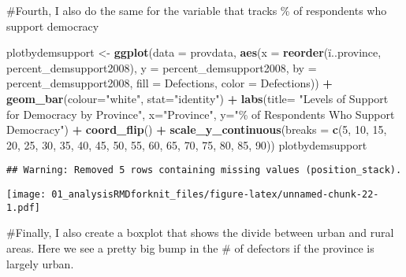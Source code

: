 \documentclass[]{article}
\newenvironment{Shaded}{\begin{snugshade}}{\end{snugshade}}
\newcommand{\DataTypeTok}[1]{\textcolor[rgb]{0.13,0.29,0.53}{#1}}
\newcommand{\DecValTok}[1]{\textcolor[rgb]{0.00,0.00,0.81}{#1}}
\newcommand{\KeywordTok}[1]{\textcolor[rgb]{0.13,0.29,0.53}{\textbf{#1}}}
\newcommand{\NormalTok}[1]{#1}
\newcommand{\OperatorTok}[1]{\textcolor[rgb]{0.81,0.36,0.00}{\textbf{#1}}}
\newcommand{\StringTok}[1]{\textcolor[rgb]{0.31,0.60,0.02}{#1}}
\begin{document}
\#Fourth, I also do the same for the variable that tracks \% of
respondents who support democracy

\begin{Shaded}
\begin{Highlighting}[]
\NormalTok{plotbydemsupport <{-}}\StringTok{ }\KeywordTok{ggplot}\NormalTok{(}\DataTypeTok{data =}\NormalTok{ provdata, }\KeywordTok{aes}\NormalTok{(}\DataTypeTok{x =} \KeywordTok{reorder}\NormalTok{(ï..province, percent\_demsupport2008), }\DataTypeTok{y =}\NormalTok{ percent\_demsupport2008, }\DataTypeTok{by =}\NormalTok{ percent\_demsupport2008, }\DataTypeTok{fill =}\NormalTok{ Defections, }\DataTypeTok{color =}\NormalTok{ Defections)) }\OperatorTok{+}\StringTok{ }\KeywordTok{geom\_bar}\NormalTok{(}\DataTypeTok{colour=}\StringTok{"white"}\NormalTok{, }\DataTypeTok{stat=}\StringTok{"identity"}\NormalTok{) }\OperatorTok{+}\StringTok{ }\KeywordTok{labs}\NormalTok{(}\DataTypeTok{title=} \StringTok{"Levels of Support for Democracy by Province"}\NormalTok{, }\DataTypeTok{x=}\StringTok{"Province"}\NormalTok{, }\DataTypeTok{y=}\StringTok{"\% of Respondents Who Support Democracy"}\NormalTok{) }\OperatorTok{+}\StringTok{ }\KeywordTok{coord\_flip}\NormalTok{() }\OperatorTok{+}\StringTok{ }\KeywordTok{scale\_y\_continuous}\NormalTok{(}\DataTypeTok{breaks =} \KeywordTok{c}\NormalTok{(}\DecValTok{5}\NormalTok{, }\DecValTok{10}\NormalTok{, }\DecValTok{15}\NormalTok{, }\DecValTok{20}\NormalTok{, }\DecValTok{25}\NormalTok{, }\DecValTok{30}\NormalTok{, }\DecValTok{35}\NormalTok{, }\DecValTok{40}\NormalTok{, }\DecValTok{45}\NormalTok{, }\DecValTok{50}\NormalTok{, }\DecValTok{55}\NormalTok{, }\DecValTok{60}\NormalTok{, }\DecValTok{65}\NormalTok{, }\DecValTok{70}\NormalTok{, }\DecValTok{75}\NormalTok{, }\DecValTok{80}\NormalTok{, }\DecValTok{85}\NormalTok{, }\DecValTok{90}\NormalTok{))}
\NormalTok{plotbydemsupport}
\end{Highlighting}
\end{Shaded}

\begin{verbatim}
## Warning: Removed 5 rows containing missing values (position_stack).
\end{verbatim}

\texttt{[image: 01\_analysisRMDforknit\_files/figure-latex/unnamed-chunk-22-1.pdf]}

\#Finally, I also create a boxplot that shows the divide between urban
and rural areas. Here we see a pretty big bump in the \# of defectors if
the province is largely urban.
\end{document}
